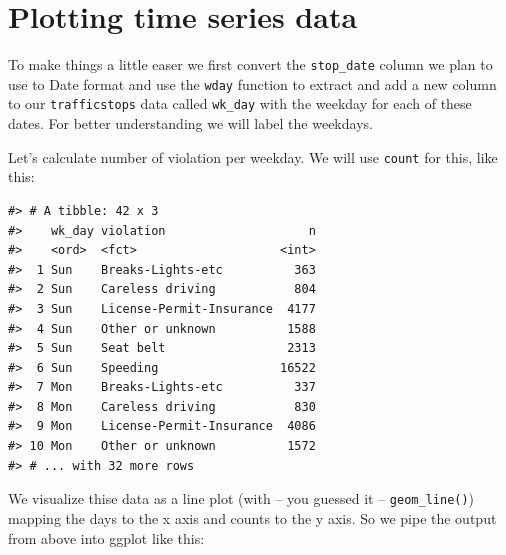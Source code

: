 \documentclass[]{book}
\newenvironment{Shaded}{\begin{snugshade}}{\end{snugshade}}
\newcommand{\DataTypeTok}[1]{\textcolor[rgb]{0.13,0.29,0.53}{#1}}
\newcommand{\KeywordTok}[1]{\textcolor[rgb]{0.13,0.29,0.53}{\textbf{#1}}}
\newcommand{\NormalTok}[1]{#1}
\newcommand{\OperatorTok}[1]{\textcolor[rgb]{0.81,0.36,0.00}{\textbf{#1}}}
\newcommand{\OtherTok}[1]{\textcolor[rgb]{0.56,0.35,0.01}{#1}}
\newcommand{\StringTok}[1]{\textcolor[rgb]{0.31,0.60,0.02}{#1}}
\begin{document}
\hypertarget{plotting-time-series-data}{%
\section{Plotting time series data}\label{plotting-time-series-data}}

To make things a little easer we first convert the \texttt{stop\_date} column we plan to use to Date format and use the \texttt{wday} function to extract and add a new column to our \texttt{trafficstops} data called \texttt{wk\_day} with the weekday for each of these dates. For better understanding we will label the weekdays.

\begin{Shaded}
\end{Shaded}

Let's calculate number of violation per weekday. We will use \texttt{count} for this, like this:

\begin{Shaded}
\end{Shaded}

\begin{verbatim}
#> # A tibble: 42 x 3
#>    wk_day violation                    n
#>    <ord>  <fct>                    <int>
#>  1 Sun    Breaks-Lights-etc          363
#>  2 Sun    Careless driving           804
#>  3 Sun    License-Permit-Insurance  4177
#>  4 Sun    Other or unknown          1588
#>  5 Sun    Seat belt                 2313
#>  6 Sun    Speeding                 16522
#>  7 Mon    Breaks-Lights-etc          337
#>  8 Mon    Careless driving           830
#>  9 Mon    License-Permit-Insurance  4086
#> 10 Mon    Other or unknown          1572
#> # ... with 32 more rows
\end{verbatim}

We visualize thise data as a line plot (with -- you guessed it -- \texttt{geom\_line()}) mapping the days to the x axis and counts to the y axis. So we pipe the output from above into ggplot like this:
\end{document}
